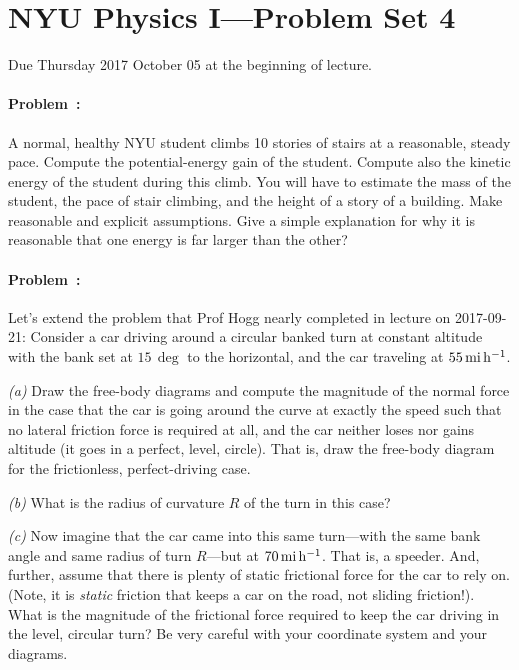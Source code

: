 \documentclass[12pt]{article}
\begin{document}
\section*{NYU Physics I---Problem Set 4}

Due Thursday 2017 October 05 at the beginning of lecture.

\paragraph{Problem~\theproblem:}%
A normal, healthy NYU student climbs 10 stories of stairs at a
reasonable, steady pace. Compute the potential-energy gain of the
student. Compute also the kinetic energy of the student during this
climb. You will have to estimate the mass of the student, the pace of
stair climbing, and the height of a story of a building. Make
reasonable and explicit assumptions. Give a simple explanation for why
it is reasonable that one energy is far larger than the other?

\paragraph{Problem~\theproblem:}%
Let's extend the problem that Prof Hogg nearly completed in lecture
on 2017-09-21: Consider a car driving around a circular banked turn at
constant altitude with the bank set at $15\,\deg$ to the horizontal,
and the car traveling at $55\,\mathrm{mi}\,\mathrm{h}^{-1}$.

\textsl{(a)} Draw the free-body diagrams and compute the magnitude of
the normal force in the case that the car is going around the curve at
exactly the speed such that no lateral friction force is required at
all, and the car neither loses nor gains altitude (it goes in a
perfect, level, circle). That is, draw the free-body diagram for the
frictionless, perfect-driving case.

\textsl{(b)} What is the radius of curvature $R$ of the turn in this
case?

\textsl{(c)} Now imagine that the car came into this same turn---with
the same bank angle and same radius of turn $R$---but at
$70\,\mathrm{mi}\,\mathrm{h}^{-1}$. That is, a speeder. And, further, assume that there is
plenty of static frictional force for the car to rely on. (Note, it is
\emph{static} friction that keeps a car on the road, not sliding
friction!). What is the magnitude of the frictional force required to
keep the car driving in the level, circular turn? Be very careful with
your coordinate system and your diagrams.
\end{document}
